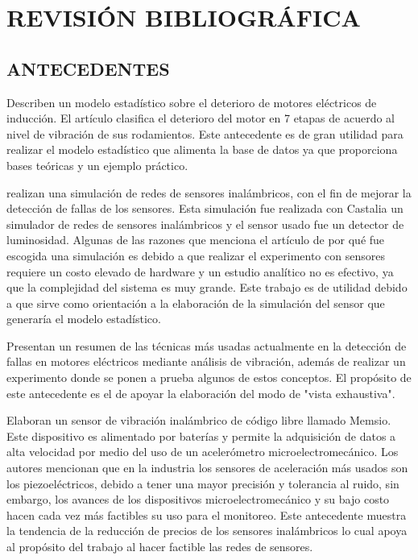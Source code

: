 \thispagestyle{empty}

\section{REVISIÓN BIBLIOGRÁFICA}

\subsection{ANTECEDENTES}

\textcite{Ramazan} Describen un modelo estadístico sobre el deterioro de
motores eléctricos de inducción. El artículo clasifica el deterioro del motor
en 7 etapas de acuerdo al nivel de vibración de sus rodamientos. Este
antecedente es de gran utilidad para realizar el modelo estadístico que alimenta
la base de datos ya que proporciona bases teóricas y un ejemplo práctico.

\textcite{Pinto} realizan una simulación de redes de sensores inalámbricos, con
el fin de mejorar la detección de fallas de los sensores. Esta simulación fue
realizada con Castalia un simulador de redes de sensores inalámbricos y el
sensor usado fue un detector de luminosidad. Algunas de las razones que
menciona el artículo de por qué fue escogida una simulación es debido a que
realizar el experimento con sensores requiere un costo elevado de hardware y un
estudio analítico no es efectivo, ya que la complejidad del sistema es muy
grande. Este trabajo es de utilidad debido a que sirve como orientación a la
elaboración de la simulación del sensor que generaría el modelo estadístico.

\textcite{Ugwiri} Presentan un resumen de las técnicas más usadas actualmente
en la detección de fallas en motores eléctricos mediante análisis de vibración,
además de realizar un experimento donde se ponen a prueba algunos de estos
conceptos. El propósito de este antecedente es el de apoyar la elaboración del
modo de "vista exhaustiva".

\textcite{Koene} Elaboran un sensor de vibración inalámbrico de código libre
llamado Memsio. Este dispositivo es alimentado por baterías y permite la
adquisición de datos a alta velocidad por medio del uso de un acelerómetro
microelectromecánico. Los autores mencionan que en la industria los sensores de
aceleración más usados son los piezoeléctricos, debido a tener una mayor
precisión y tolerancia al ruido, sin embargo, los avances de los dispositivos
microelectromecánico y su bajo costo hacen cada vez más factibles su uso para
el monitoreo. Este antecedente muestra la tendencia de la reducción de precios
de los sensores inalámbricos lo cual apoya al propósito del trabajo al hacer
factible las redes de sensores.

